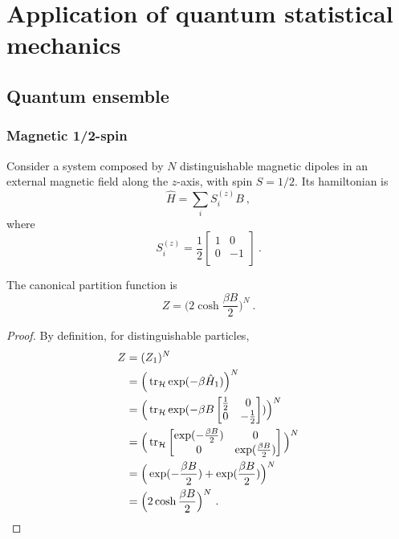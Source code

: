 \part{Application of quantum statistical mechanics}

\chapter{Quantum ensemble}

\section{Magnetic 1/2-spin}

    Consider a system composed by $N$ distinguishable magnetic dipoles in an external magnetic field along the $z$-axis, with spin $S = 1/2$. Its hamiltonian is 
    \begin{equation*}
        \hat H = \sum_i S^{(z)}_i B ~,
    \end{equation*}
    where
    \begin{equation*}
        S^{(z)}_i = \frac{1}{2} \begin{bmatrix}
            1 & 0 \\
            0 & -1 \\
        \end{bmatrix} ~.
    \end{equation*}

    The canonical partition function is 
    \begin{equation*}
        Z = \Big ( 2 \cosh \frac{\beta B}{2} \Big)^N ~.
    \end{equation*}
    \begin{proof}
        By definition, for distinguishable particles,
        \begin{equation*}
        \begin{aligned}
            Z & = (Z_1)^N \\ & = \Big (\operatorname{tr}_{\mathcal H} \exp(- \beta \hat H_1) \Big)^N \\ & = \Big (\operatorname{tr}_{\mathcal H} \exp(- \beta B \begin{bmatrix}
                \frac{1}{2} & 0 \\ 0 & - \frac{1}{2} \\ 
            \end{bmatrix}) \Big)^N \\ & = \Big(\operatorname{tr}_{\mathcal H} \begin{bmatrix}
                \exp(- \frac{\beta B}{2}) & 0 \\ 0 & \exp(\frac{\beta B}{2}) \\ 
            \end{bmatrix} \Big )^N \\ & = \Big( \exp(- \frac{\beta B}{2}) + \exp(\frac{\beta B}{2}) \Big)^N \\ & = \Big ( 2 \cosh \frac{\beta B}{2} \Big)^N ~.
        \end{aligned}
        \end{equation*}
    \end{proof}

